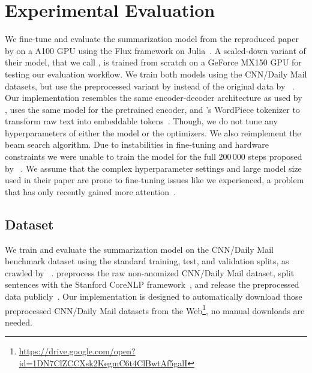 \section{Experimental Evaluation} %

We fine-tune and evaluate the \BertSumAbs summarization model from the reproduced paper by \citeauthor{LiuL2019} on a A100 GPU using the Flux framework on Julia~\cite{InnesSFGRJKPS2018,BezansonEKS2017,LiuL2019}.
A scaled-down variant of their \TransformerAbs model, that we call \TransformerAbsTiny, is trained from scratch on a GeForce MX150 GPU for testing our evaluation workflow.
We train both models using the CNN/Daily Mail datasets, but use the preprocessed variant by \citeauthor{LiuL2019} instead of the original data by \citeauthor{HermannKGEKSB2015}~\cite{LiuL2019,HermannKGEKSB2015}.
Our implementation resembles the same encoder-decoder architecture as used by \citeauthor{LiuL2019}, uses the same \BertBase model for the pretrained encoder, and \Bert's WordPiece tokenizer to transform raw text into embeddable tokens~\cite{LiuL2019,DevlinCLT2019}.
Though, we do not tune any hyperparameters of either the model or the optimizers.
We also reimplement the beam search algorithm.
Due to instabilities in fine-tuning and hardware constraints we were unable to train the model for the full 200\,000 steps proposed by \citeauthor{LiuL2019}~\cite{LiuL2019}.
We assume that the complex hyperparameter settings and large model size used in their paper are prone to fine-tuning issues like we experienced, a problem that has only recently gained more attention~\cite{DodgeISFHS2020,ZhangWKWA2020,AghajanyanSGGZG2020}.

\subsection{Dataset}

We train and evaluate the summarization model on the CNN/Daily Mail benchmark dataset using the standard training, test, and validation splits, as crawled by \citeauthor{NallapatiZSGX2016}~\cite{HermannKGEKSB2015,NallapatiZSGX2016}.
\citeauthor{LiuL2019} preprocess the raw non-anomized CNN/Daily Mail dataset, split sentences with the Stanford CoreNLP framework~\cite{ManningSBFBM2014}, and release the preprocessed data publicly~\cite{LiuL2019}.
Our implementation is designed to automatically download those preprocessed CNN/Daily Mail datasets from the Web\footnote{\url{https://drive.google.com/open?id=1DN7ClZCCXsk2KegmC6t4ClBwtAf5galI}}, no manual downloads are needed.

